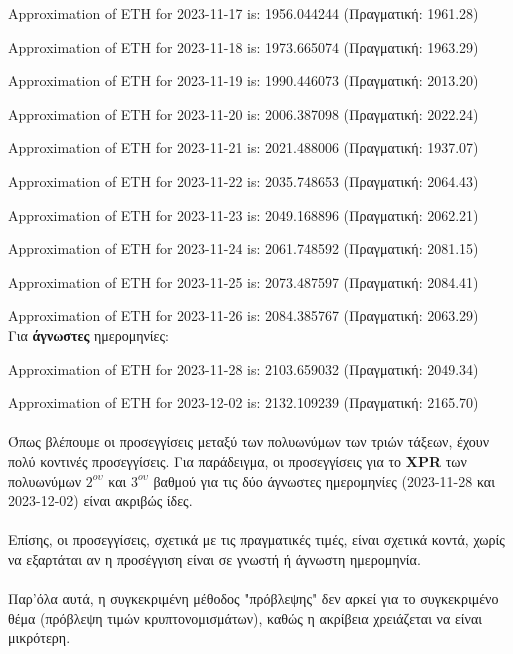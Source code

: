 \documentclass[a4paper, 14pt]{article}   %
\begin{document}
Approximation of ETH for 2023-11-17 is: 1956.044244 \small{(Πραγματική: 1961.28)}

Approximation of ETH for 2023-11-18 is: 1973.665074 \small{(Πραγματική: 1963.29)}

Approximation of ETH for 2023-11-19 is: 1990.446073 \small{(Πραγματική: 2013.20)}

Approximation of ETH for 2023-11-20 is: 2006.387098 \small{(Πραγματική: 2022.24)}

Approximation of ETH for 2023-11-21 is: 2021.488006 \small{(Πραγματική: 1937.07)}

Approximation of ETH for 2023-11-22 is: 2035.748653 \small{(Πραγματική: 2064.43)}

Approximation of ETH for 2023-11-23 is: 2049.168896 \small{(Πραγματική: 2062.21)}

Approximation of ETH for 2023-11-24 is: 2061.748592 \small{(Πραγματική: 2081.15)}

Approximation of ETH for 2023-11-25 is: 2073.487597 \small{(Πραγματική: 2084.41)}

Approximation of ETH for 2023-11-26 is: 2084.385767 \small{(Πραγματική: 2063.29)}\\

Για \textbf{άγνωστες} ημερομηνίες:

Approximation of ETH for 2023-11-28 is: 2103.659032 \small{(Πραγματική: 2049.34)}

Approximation of ETH for 2023-12-02 is: 2132.109239 \small{(Πραγματική: 2165.70)}\\\\
Όπως βλέπουμε οι προσεγγίσεις μεταξύ των πολυωνύμων των τριών τάξεων, έχουν πολύ κοντινές προσεγγίσεις. Για παράδειγμα, οι προσεγγίσεις για το \textbf{XPR} των πολυωνύμων $2^{ου}$ και $3^{ου}$ βαθμού για τις δύο άγνωστες ημερομηνίες \small(2023-11-28 και 2023-12-02) είναι ακριβώς ίδες.\\\\
Επίσης, οι προσεγγίσεις, σχετικά με τις πραγματικές τιμές, είναι σχετικά κοντά, χωρίς να εξαρτάται αν η προσέγγιση είναι σε γνωστή ή άγνωστη ημερομηνία.\\\\
Παρ'όλα αυτά, η συγκεκριμένη μέθοδος "πρόβλεψης" δεν αρκεί για το συγκεκριμένο θέμα (πρόβλεψη τιμών κρυπτονομισμάτων), καθώς η ακρίβεια χρειάζεται να είναι μικρότερη.
\end{document}
